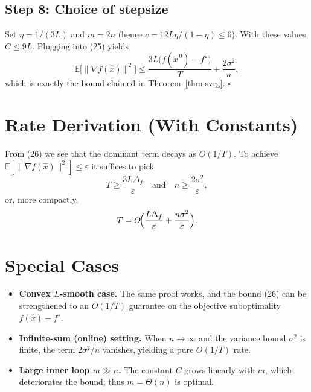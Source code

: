\documentclass{article}
\newcommand{\EE}{\mathbb{E}}
\begin{document}
\subsection*{Step 8: Choice of stepsize}
Set $\eta=1/(3L)$ and $m=2n$ (hence $c=12L\eta/(1-\eta)\le 6$).  With these values $C\le 9L$.
Plugging into (25) yields
\[
\EE\!\bigl[\|\nabla f(\hat{x})\|^{2}\bigr]
\le \frac{3L\bigl(f(\tilde{x}^{\,0})-f^{\star}\bigr)}{T}
+\frac{2\sigma^{2}}{n},
\tag{26}
\]
which is exactly the bound claimed in Theorem~\ref{thm:svrg}.  $\square$

\section*{Rate Derivation (With Constants)}
From (26) we see that the dominant term decays as $O(1/T)$.  To achieve $\EE[\|\nabla f(\hat{x})\|^{2}]\le\varepsilon$ it suffices to pick
\[
T\ge \frac{3L\Delta_f}{\varepsilon}\quad\text{and}\quad
n\ge \frac{2\sigma^{2}}{\varepsilon},
\]
or, more compactly,
\[
T = O\!\Bigl(\frac{L\Delta_f}{\varepsilon} + \frac{n\sigma^{2}}{\varepsilon}\Bigr).
\]

\section*{Special Cases}
\begin{itemize}
\item \textbf{Convex $L$‑smooth case.} The same proof works, and the bound (26) can be strengthened to an $O(1/T)$ guarantee on the objective suboptimality $f(\hat{x})-f^{\star}$.
\item \textbf{Infinite‑sum (online) setting.} When $n\to\infty$ and the variance bound $\sigma^{2}$ is finite, the term $2\sigma^{2}/n$ vanishes, yielding a pure $O(1/T)$ rate.
\item \textbf{Large inner loop $m\gg n$.} The constant $C$ grows linearly with $m$, which deteriorates the bound; thus $m=\Theta(n)$ is optimal.
\end{itemize}
\end{document}
